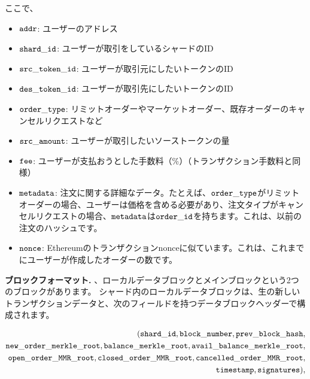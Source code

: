 ここで、
\begin{itemize}
\item ${\mathtt{addr}}$: ユーザーのアドレス
\item ${\mathtt{shard\_id}}$: ユーザーが取引をしているシャードのID
\item ${\mathtt{src\_token\_id}}$: ユーザーが取引元にしたいトークンのID
\item ${\mathtt{des\_token\_id}}$: ユーザーが取引先にしたいトークンのID
\item ${\mathtt{order\_type}}$: リミットオーダーやマーケットオーダー、既存オーダーのキャンセルリクエストなど
\item ${\mathtt{src\_amount}}$: ユーザーが取引したいソーストークンの量
\item ${\mathtt{fee}}$: ユーザーが支払おうとした手数料（\%）（トランザクション手数料と同様）
\item ${\mathtt{metadata}}$: 注文に関する詳細なデータ。たとえば、${\mathtt{order\_type}}$がリミットオーダーの場合、ユーザーは価格を含める必要があり、注文タイプがキャンセルリクエストの場合、${\mathtt{metadata}}$は${\mathtt{order\_id}}$を持ちます。これは、以前の注文のハッシュです。
\item ${\mathtt{nonce}}$: Ethereumのトランザクションnonceに似ています。これは、これまでにユーザーが作成したオーダーの数です。
\end{itemize}

\textbf{ブロックフォーマット.} 、ローカルデータブロックとメインブロックという2つのブロックがあります。 シャード内のローカルデータブロックは、生の新しいトランザクションデータと、次のフィールドを持つデータブロックヘッダーで構成されます。

\begin{align*}
({\mathtt{shard\_id}}, {\mathtt{block\_number}}, {\mathtt{prev\_block\_hash}},\\ {\mathtt{new\_order\_merkle\_root}}, {\mathtt{balance\_merkle\_root}}, {\mathtt{avail\_balance\_merkle\_root}},\\ {\mathtt{open\_order\_MMR\_root}}, {\mathtt{closed\_order\_MMR\_root}}, {\mathtt{cancelled\_order\_MMR\_root}},\\ {\mathtt{timestamp}}, {\mathtt{signatures}}),
\end{align*}

